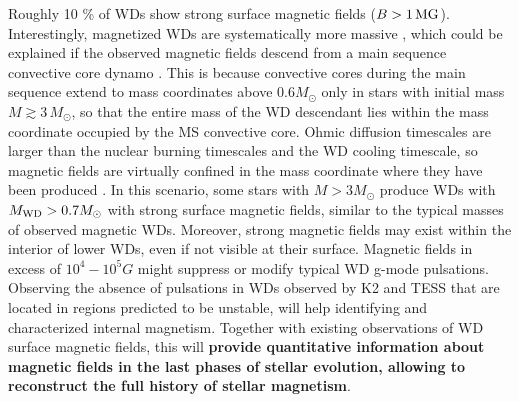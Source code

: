 
Roughly 10 \% of WDs show strong surface magnetic fields ($B > 1 \, {\rm MG}$).
Interestingly, magnetized WDs are systematically more massive \cite{Ferrario_2015}, which could be explained if the observed magnetic fields descend from a main sequence convective core dynamo \cite{Cantiello_2016}. This is because convective cores during the main sequence extend to mass coordinates above 0.6$M_\odot$ only in stars with initial mass $M \gtrsim 3 \, M_\odot$, so that the entire mass of the WD descendant lies within the mass coordinate occupied by the MS convective core. Ohmic diffusion timescales are larger than the nuclear burning timescales and the WD cooling timescale, so magnetic fields are virtually confined in the mass coordinate where they have been produced \cite{Cantiello_2016}. In this scenario, some stars with $M>3M_\odot$ produce WDs with $M_{\rm WD}>0.7M_\odot$ with strong surface magnetic fields, similar to the typical masses of observed magnetic WDs. Moreover, strong magnetic fields may exist within the interior of lower WDs, even if not visible at their surface. Magnetic fields in excess of $10^4-10^5 G$ might suppress or modify typical WD g-mode pulsations. Observing the absence of pulsations in WDs observed by K2 and TESS that are located in regions predicted to be unstable, will help identifying and characterized internal magnetism. Together with existing observations of WD surface magnetic fields, this will \textbf{provide quantitative information about magnetic fields in the last phases of stellar evolution, allowing to reconstruct the full history of stellar magnetism}.